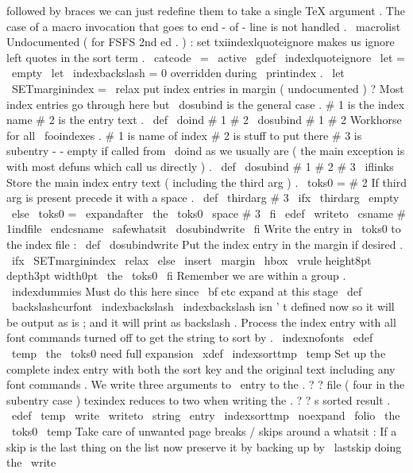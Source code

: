 {{{{{followed
by
braces
we
can
just
redefine
them
%
to
take
a
single
TeX
argument
.
The
case
of
a
macro
invocation
that
%
goes
to
end
-
of
-
line
is
not
handled
.
%
\
macrolist
}
%
Undocumented
(
for
FSFS
2nd
ed
.
)
:
set
txiindexlquoteignore
makes
us
%
ignore
left
quotes
in
the
sort
term
.
{
\
catcode
\
=
\
active
\
gdef
\
indexlquoteignore
{
\
let
=
\
empty
}
}
\
let
\
indexbackslash
=
0
%
overridden
during
\
printindex
.
\
let
\
SETmarginindex
=
\
relax
%
put
index
entries
in
margin
(
undocumented
)
?
%
Most
index
entries
go
through
here
but
\
dosubind
is
the
general
case
.
%
#
1
is
the
index
name
#
2
is
the
entry
text
.
\
def
\
doind
#
1
#
2
{
\
dosubind
{
#
1
}
{
#
2
}
{
}
}
%
Workhorse
for
all
\
fooindexes
.
%
#
1
is
name
of
index
#
2
is
stuff
to
put
there
#
3
is
subentry
-
-
%
empty
if
called
from
\
doind
as
we
usually
are
(
the
main
exception
%
is
with
most
defuns
which
call
us
directly
)
.
%
\
def
\
dosubind
#
1
#
2
#
3
{
%
\
iflinks
{
%
%
Store
the
main
index
entry
text
(
including
the
third
arg
)
.
\
toks0
=
{
#
2
}
%
%
If
third
arg
is
present
precede
it
with
a
space
.
\
def
\
thirdarg
{
#
3
}
%
\
ifx
\
thirdarg
\
empty
\
else
\
toks0
=
\
expandafter
{
\
the
\
toks0
\
space
#
3
}
%
\
fi
%
\
edef
\
writeto
{
\
csname
#
1indfile
\
endcsname
}
%
%
\
safewhatsit
\
dosubindwrite
}
%
\
fi
}
%
Write
the
entry
in
\
toks0
to
the
index
file
:
%
\
def
\
dosubindwrite
{
%
%
Put
the
index
entry
in
the
margin
if
desired
.
\
ifx
\
SETmarginindex
\
relax
\
else
\
insert
\
margin
{
\
hbox
{
\
vrule
height8pt
depth3pt
width0pt
\
the
\
toks0
}
}
%
\
fi
%
%
Remember
we
are
within
a
group
.
\
indexdummies
%
Must
do
this
here
since
\
bf
etc
expand
at
this
stage
\
def
\
backslashcurfont
{
\
indexbackslash
}
%
\
indexbackslash
isn
'
t
defined
now
%
so
it
will
be
output
as
is
;
and
it
will
print
as
backslash
.
%
%
Process
the
index
entry
with
all
font
commands
turned
off
to
%
get
the
string
to
sort
by
.
{
\
indexnofonts
\
edef
\
temp
{
\
the
\
toks0
}
%
need
full
expansion
\
xdef
\
indexsorttmp
{
\
temp
}
%
}
%
%
%
Set
up
the
complete
index
entry
with
both
the
sort
key
and
%
the
original
text
including
any
font
commands
.
We
write
%
three
arguments
to
\
entry
to
the
.
?
?
file
(
four
in
the
%
subentry
case
)
texindex
reduces
to
two
when
writing
the
.
?
?
s
%
sorted
result
.
\
edef
\
temp
{
%
\
write
\
writeto
{
%
\
string
\
entry
{
\
indexsorttmp
}
{
\
noexpand
\
folio
}
{
\
the
\
toks0
}
}
%
}
%
\
temp
}
%
Take
care
of
unwanted
page
breaks
/
skips
around
a
whatsit
:
%
%
If
a
skip
is
the
last
thing
on
the
list
now
preserve
it
%
by
backing
up
by
\
lastskip
doing
the
\
write
}}}}
